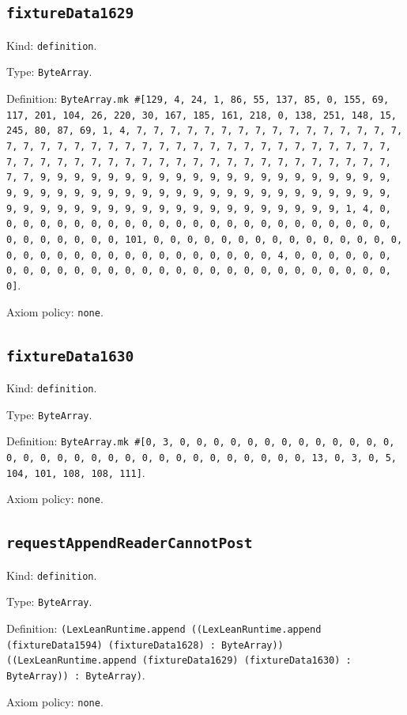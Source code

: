 \documentclass[11pt]{article}
\begin{document}
\subsection*{\texttt{fixtureData1629}}
\noindent Kind: \texttt{definition}.\par
\noindent Type: \texttt{ByteArray}.\par
\noindent Definition: \texttt{ByteArray.mk \#[129, 4, 24, 1, 86, 55, 137, 85, 0, 155, 69, 117, 201, 104, 26, 220, 30, 167, 185, 161, 218, 0, 138, 251, 148, 15, 245, 80, 87, 69, 1, 4, 7, 7, 7, 7, 7, 7, 7, 7, 7, 7, 7, 7, 7, 7, 7, 7, 7, 7, 7, 7, 7, 7, 7, 7, 7, 7, 7, 7, 7, 7, 7, 7, 7, 7, 7, 7, 7, 7, 7, 7, 7, 7, 7, 7, 7, 7, 7, 7, 7, 7, 7, 7, 7, 7, 7, 7, 7, 7, 7, 7, 7, 7, 7, 7, 9, 9, 9, 9, 9, 9, 9, 9, 9, 9, 9, 9, 9, 9, 9, 9, 9, 9, 9, 9, 9, 9, 9, 9, 9, 9, 9, 9, 9, 9, 9, 9, 9, 9, 9, 9, 9, 9, 9, 9, 9, 9, 9, 9, 9, 9, 9, 9, 9, 9, 9, 9, 9, 9, 9, 9, 9, 9, 9, 9, 9, 9, 9, 9, 1, 4, 0, 0, 0, 0, 0, 0, 0, 0, 0, 0, 0, 0, 0, 0, 0, 0, 0, 0, 0, 0, 0, 0, 0, 0, 0, 0, 0, 0, 0, 0, 0, 101, 0, 0, 0, 0, 0, 0, 0, 0, 0, 0, 0, 0, 0, 0, 0, 0, 0, 0, 0, 0, 0, 0, 0, 0, 0, 0, 0, 0, 0, 0, 0, 4, 0, 0, 0, 0, 0, 0, 0, 0, 0, 0, 0, 0, 0, 0, 0, 0, 0, 0, 0, 0, 0, 0, 0, 0, 0, 0, 0, 0, 0, 0]}.\par
\noindent Axiom policy: \texttt{none}.\par
\subsection*{\texttt{fixtureData1630}}
\noindent Kind: \texttt{definition}.\par
\noindent Type: \texttt{ByteArray}.\par
\noindent Definition: \texttt{ByteArray.mk \#[0, 3, 0, 0, 0, 0, 0, 0, 0, 0, 0, 0, 0, 0, 0, 0, 0, 0, 0, 0, 0, 0, 0, 0, 0, 0, 0, 0, 0, 0, 0, 0, 0, 13, 0, 3, 0, 5, 104, 101, 108, 108, 111]}.\par
\noindent Axiom policy: \texttt{none}.\par
\subsection*{\texttt{requestAppendReaderCannotPost}}
\noindent Kind: \texttt{definition}.\par
\noindent Type: \texttt{ByteArray}.\par
\noindent Definition: \texttt{(LexLeanRuntime.append ((LexLeanRuntime.append (fixtureData1594) (fixtureData1628) : ByteArray)) ((LexLeanRuntime.append (fixtureData1629) (fixtureData1630) : ByteArray)) : ByteArray)}.\par
\noindent Axiom policy: \texttt{none}.\par
\end{document}
